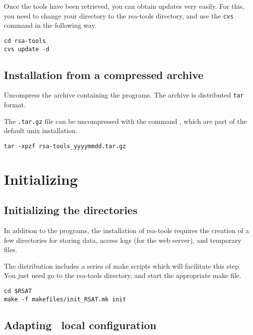 \documentclass[12pt,a4paper, oneside]{scrreprt} %
\begin{document}
Once the tools have been retrieved, you can obtain updates very
easily. For this, you need to change your directory to the rsa-tools
directory, and use the \texttt{cvs} command in the following way.

\begin{lstlisting}
cd rsa-tools
cvs update -d
\end{lstlisting}



\section{Installation from a compressed archive}

Uncompress the archive containing the programs. The archive is
distributed \texttt{tar} format.

The \texttt{.tar.gz} file can be uncompressed with the command
, which are part of the default unix installation.

\begin{lstlisting}
tar -xpzf rsa-tools_yyyymmdd.tar.gz
\end{lstlisting}

\chapter{Initializing \RSAT}




\section{Initializing the directories}

In addition to the programs, the installation of rsa-tools requires
the creation of a few directories for storing data, access logs (for
the web server), and temporary files.

The distribution includes a series of make scripts which will
facilitate this step. You just need go to the rsa-tools directory, and
start the appropriate make file.

\begin{lstlisting}
cd $RSAT
make -f makefiles/init_RSAT.mk init
\end{lstlisting}

\section{Adapting \RSAT \  local configuration}
\end{document}
